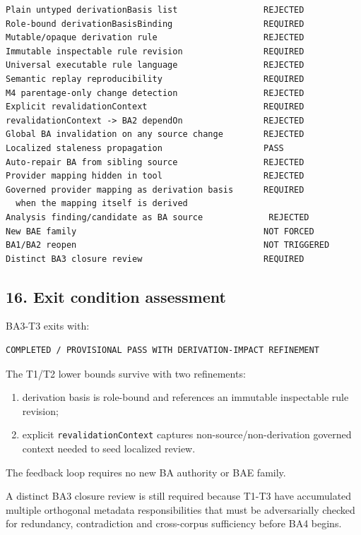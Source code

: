 \documentclass[11pt,a4paper]{article}
\providecommand{\tightlist}{\setlength{\itemsep}{0pt}\setlength{\parskip}{0pt}}
\begin{document}
\begin{verbatim}
Plain untyped derivationBasis list                 REJECTED
Role-bound derivationBasisBinding                  REQUIRED
Mutable/opaque derivation rule                     REJECTED
Immutable inspectable rule revision                REQUIRED
Universal executable rule language                 REJECTED
Semantic replay reproducibility                    REQUIRED
M4 parentage-only change detection                 REJECTED
Explicit revalidationContext                       REQUIRED
revalidationContext -> BA2 dependOn                REJECTED
Global BA invalidation on any source change        REJECTED
Localized staleness propagation                    PASS
Auto-repair BA from sibling source                 REJECTED
Provider mapping hidden in tool                    REJECTED
Governed provider mapping as derivation basis      REQUIRED
  when the mapping itself is derived
Analysis finding/candidate as BA source             REJECTED
New BAE family                                     NOT FORCED
BA1/BA2 reopen                                     NOT TRIGGERED
Distinct BA3 closure review                        REQUIRED
\end{verbatim}

\subsection{16. Exit condition
assessment}\label{exit-condition-assessment}

BA3-T3 exits with:

\begin{verbatim}
COMPLETED / PROVISIONAL PASS WITH DERIVATION-IMPACT REFINEMENT
\end{verbatim}

The T1/T2 lower bounds survive with two refinements:

\begin{enumerate}
\def\labelenumi{\arabic{enumi}.}
\tightlist
\item
  derivation basis is role-bound and references an immutable inspectable
  rule revision;
\item
  explicit \texttt{revalidationContext} captures
  non-source/non-derivation governed context needed to seed localized
  review.
\end{enumerate}

The feedback loop requires no new BA authority or BAE family.

A distinct BA3 closure review is still required because T1-T3 have
accumulated multiple orthogonal metadata responsibilities that must be
adversarially checked for redundancy, contradiction and cross-corpus
sufficiency before BA4 begins.
\end{document}
